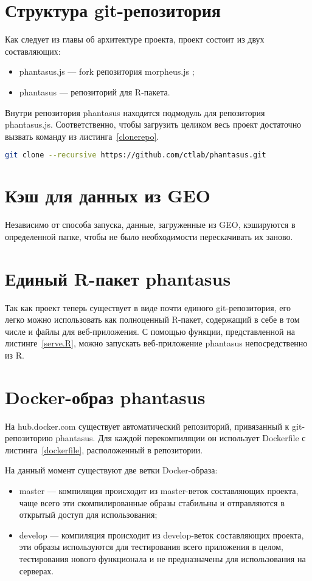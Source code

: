 \section{Структура git-репозитория}
Как следует из главы об архитектуре проекта, проект состоит из двух составляющих:
\begin{itemize}
\item phantasus.js --- fork репозитория morpheus.js \cite{morpheus};
\item phantasus --- репозиторий для R-пакета.
\end{itemize}
Внутри репозитория phantasus находится подмодуль для репозитория phantasus.js.
Соответственно, чтобы загрузить целиком весь проект достаточно вызвать команду из листинга~\ref{clonerepo}.
\begin{lstlisting}[float=!h,language=bash,label={clonerepo},caption={Клонирование репозитория проекта phantasus}]
  git clone --recursive https://github.com/ctlab/phantasus.git
\end{lstlisting}

\section{Кэш для данных из GEO}
Независимо от способа запуска, данные, загруженные из GEO, кэшируются в определенной папке, чтобы не было необходимости перескачивать их заново.

\section{Единый R-пакет phantasus}
Так как проект теперь существует в виде почти единого git-репозитория, его легко можно использовать как полноценный R-пакет, содержащий в себе в том числе и файлы для веб-приложения.
С помощью функции, представленной на листинге~\ref{serve.R}, можно запускать веб-приложение phantasus непосредственно из R.


\section{Docker-образ phantasus}
На hub.docker.com существует автоматический репозиторий, привязанный к git-репозиторию phantasus. Для каждой перекомпиляции он использует Dockerfile с листинга~\ref{dockerfile}, расположенный в репозитории.

На данный момент существуют две ветки Docker-образа:
\begin{itemize}
\item master --- компиляция происходит из master-веток составляющих проекта, чаще всего эти скомпилированные образы стабильны и отправляются в открытый доступ для использования;
\item develop --- компиляция происходит из develop-веток составляющих проекта, эти образы используются для тестирования всего приложения в целом, тестирования нового функционала и не предназначены для использования на серверах.
\end{itemize}

